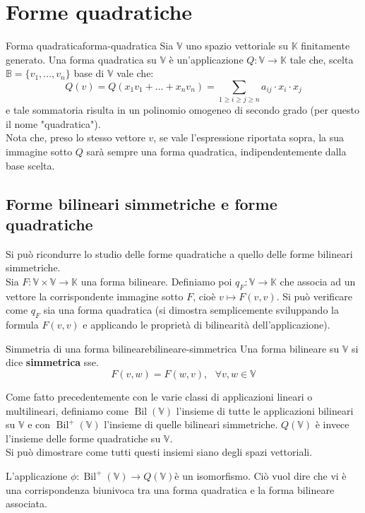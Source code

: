 \documentclass[12pt]{report}
\newcommand{\whitespace}{\text{ }}
\newcommand{\K}{\mathbb{K}}
\newcommand{\V}{\mathbb{V}}
\newcommand{\vectors}[1]{#1_1, \dots, #1_n}
\begin{document}
	\chapter{Forme quadratiche}
	\begin{definizione}{Forma quadratica}{forma-quadratica}
		Sia $\V$ uno spazio vettoriale su $\K$ finitamente generato.
		Una forma quadratica su $\V$ è un'applicazione $Q: \V \to \K$ tale che, scelta $\mathbb{B} = \{\vectors{v}\}$ base di $\V$ vale che:
		\[
			Q(v) = Q(x_1v_1 + \dots + x_nv_n) = \sum_{1 \geq i \geq j \geq n} a_{ij} \cdot x_i \cdot x_j
		\]
		e tale sommatoria risulta in un polinomio omogeneo di secondo grado (per questo il nome "quadratica").\\
		Nota che, preso lo stesso vettore $v$, se vale l'espressione riportata sopra, la sua immagine sotto $Q$ sarà sempre una forma quadratica, indipendentemente dalla base scelta.
	\end{definizione}
	
	\section{Forme bilineari simmetriche e forme quadratiche}
	Si può ricondurre lo studio delle forme quadratiche a quello delle forme bilineari simmetriche.\\
	Sia $F: \V \times \V \to \K$ una forma bilineare. Definiamo poi $q_F: \V \to \K$ che associa ad un vettore la corrispondente immagine sotto $F$, cioè $v \mapsto F(v, v)$. Si può verificare come $q_F$ sia una forma quadratica (si dimostra semplicemente sviluppando la formula $F(v, v)$ e applicando le proprietà di bilinearità dell'applicazione).
	
	\begin{definizione}{Simmetria di una forma bilineare}{bilineare-simmetrica}
		Una forma bilineare su $\V$ si dice \textbf{simmetrica} sse.
		\[
			F(v, w) = F(w, v), \whitespace \forall v,w \in \V
		\]
	\end{definizione}
	
	Come fatto precedentemente con le varie classi di applicazioni lineari o multilineari, definiamo come $\operatorname{Bil}(\V)$ l'insieme di tutte le applicazioni bilineari su $\V$ e con $\operatorname{Bil}^+(\V)$ l'insieme di quelle bilineari simmetriche.
	$Q(\V)$ è invece l'insieme delle forme quadratiche su $\V$.\\
	Si può dimostrare come tutti questi insiemi siano degli spazi vettoriali.
	
	\begin{proposizione}{}{}
		L'applicazione $\phi: \operatorname{Bil}^+(\V) \to Q(\V)$è un isomorfismo. Ciò vuol dire che vi è una corrispondenza biunivoca tra una forma quadratica e la forma bilineare associata.
	\end{proposizione}
	
\end{document}
